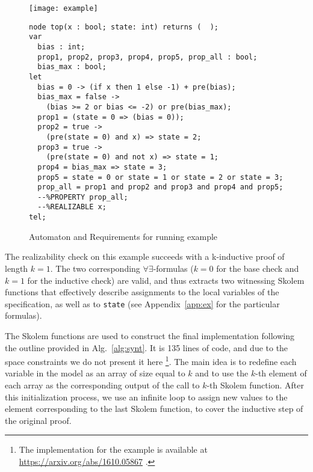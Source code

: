 \begin{figure}[tb]
\begin{minipage}[c]{0.35\textwidth}
\centering
\texttt{[image: example]}
\end{minipage}
\begin{minipage}[c]{0.7\textwidth}
 \begin{Verbatim}[fontsize=\scriptsize]
node top(x : bool; state: int) returns (  );
var
  bias : int;
  prop1, prop2, prop3, prop4, prop5, prop_all : bool;
  bias_max : bool;
let
  bias = 0 -> (if x then 1 else -1) + pre(bias);
  bias_max = false ->
	(bias >= 2 or bias <= -2) or pre(bias_max);
  prop1 = (state = 0 => (bias = 0));
  prop2 = true ->
  	(pre(state = 0) and x) => state = 2;
  prop3 = true ->
  	(pre(state = 0) and not x) => state = 1;
  prop4 = bias_max => state = 3;
  prop5 = state = 0 or state = 1 or state = 2 or state = 3;
  prop_all = prop1 and prop2 and prop3 and prop4 and prop5;
  --%PROPERTY prop_all;
  --%REALIZABLE x;
tel;
 \end{Verbatim}
\end{minipage}
\caption{Automaton and Requirements for running example}
\label{fg:example}
\end{figure}

The realizability check on this example succeeds with a k-inductive
proof of length $k = 1$. The two corresponding
$\forall\exists$-formulas ($k=0$ for the base check and $k=1$ for the
inductive check) are valid, and thus \aeval extracts two witnessing
Skolem functions that effectively describe assignments to the local
variables of the specification, as well as to \texttt{state} (see
Appendix~\ref{app:ex} for the particular formulas).

The Skolem functions are used to construct the final implementation
following the outline provided in Alg.~\ref{alg:synt}. 
It is 135 lines of code, and due to the space constraints we do not
present it here%
\footnote{The implementation for the
example is available at \url{https://arxiv.org/abs/1610.05867} .}.
The main idea is to redefine each variable in the model 
as an array of size equal to $k$ and
to use the $k$-th element of each array as the corresponding output of the call
to $k$-th Skolem function. After this initialization process, we use an infinite
loop to assign new values to the element corresponding to the last Skolem
function, to cover the inductive step of the original proof.

